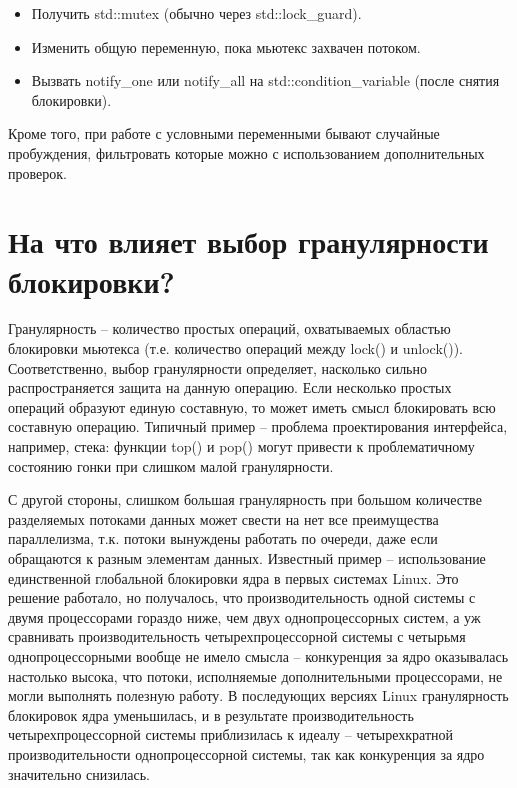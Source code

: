 \documentclass[a4paper,12pt]{article}	%
\begin{document}
	\begin{itemize}
	
		\item Получить std::mutex (обычно через std::lock\_guard).
		\item Изменить общую переменную, пока мьютекс захвачен потоком.
		\item Вызвать notify\_one или notify\_all на std::condition\_variable (после снятия блокировки).

	\end{itemize}
	
	Кроме того, при работе с условными переменными бывают случайные пробуждения, фильтровать которые можно с использованием дополнительных проверок.
	
\section{На что влияет выбор гранулярности блокировки?}

	Гранулярность -- количество простых операций, охватываемых областью блокировки мьютекса (т.е. количество операций между lock() и unlock()). Соответственно, выбор гранулярности определяет, насколько сильно распространяется защита на данную операцию. Если несколько простых операций образуют единую составную, то может иметь смысл блокировать всю составную операцию. Типичный пример -- проблема проектирования интерфейса, например, стека: функции top() и pop() могут привести к проблематичному состоянию гонки при слишком малой гранулярности.
	
	С другой стороны, слишком большая гранулярность при большом количестве разделяемых потоками данных может свести на нет все преимущества параллелизма, т.к. потоки вынуждены работать по очереди, даже если обращаются к разным элементам данных. Известный пример --  использование  единственной глобальной блокировки ядра в первых системах Linux. Это решение работало, но получалось, что производительность одной системы с двумя процессорами гораздо ниже, чем двух однопроцессорных систем, а уж сравнивать производительность четырехпроцессорной системы с четырьмя однопроцессорными вообще не имело смысла -- конкуренция за ядро оказывалась настолько высока, что потоки, исполняемые дополнительными процессорами, не могли выполнять полезную работу. В последующих версиях Linux гранулярность блокировок ядра уменьшилась, и в результате производительность четырехпроцессорной системы приблизилась к идеалу – четырехкратной производительности однопроцессорной системы, так как  конкуренция за ядро значительно снизилась.
	
\end{document}
